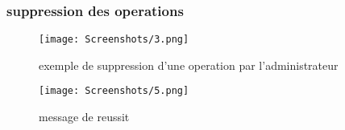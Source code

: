   \subsubsection{suppression des operations}
  \begin{figure}[!htbp]
    \begin{minipage}[t]{0.4\textwidth}    %
            \texttt{[image: Screenshots/3.png]}
            \caption{ exemple de suppression d'une operation par l'administrateur}
    \end{minipage}%
    \begin{minipage}{0.20\textwidth}
      \hfill
    \end{minipage}
  \begin{minipage}[t]{0.4\textwidth}
          \texttt{[image: Screenshots/5.png]}
          \caption{ message de reussit}
  \end{minipage}%
    \end{figure}


